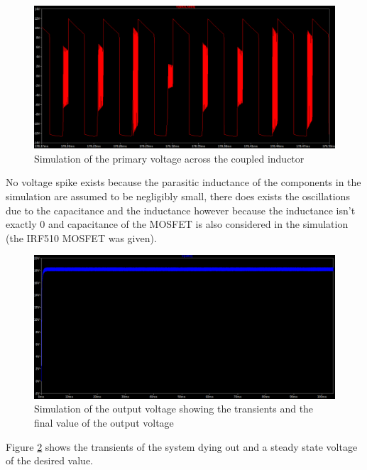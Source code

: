\documentclass[a4paper, 12pt]{article}
\begin{document}
\begin{figure}[H]
  \centering
  \includegraphics[width=\textwidth]{images/primary_sim.png}
  \caption{Simulation of the primary voltage across the coupled inductor}
  \label{fig:primary_sim}
\end{figure}

No voltage spike exists because the parasitic inductance of the components in the simulation are assumed to be negligibly small, there does exists the oscillations due to the capacitance and the inductance however because the inductance isn't exactly $0$ and capacitance of the MOSFET is also considered in the simulation (the IRF510 MOSFET was given).

\begin{figure}[H]
  \centering
  \includegraphics[width=\textwidth]{images/output_1_sim.png}
  \caption{Simulation of the output voltage showing the transients and the final value of the output voltage}
  \label{fig:output_1_sim}
\end{figure} 

Figure \ref{fig:output_1_sim} shows the transients of the system dying out and a steady state voltage of the desired value.
\end{document}
